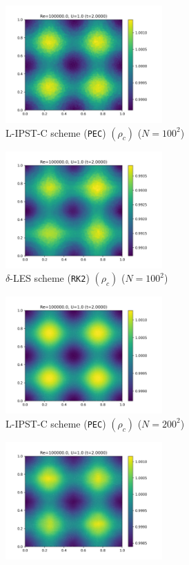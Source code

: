 \begin{figure}[htbp!]
  \begin{subfigure}{7cm}
    \centering\includegraphics[width=6cm]{Code-Figures/long-tgv/c0_20_tait_hdx_2_pec_dtmul_1_sd_n_o_files_50_nx_100_pst_10_re_100000_tsph_wcsph_tf_2/final_rhoc.png}
    \caption{L-IPST-C scheme (\texttt{PEC}) $(\rho_c)$ ($N=100^2$)}
  \end{subfigure}
  \begin{subfigure}{7cm}
    \centering\includegraphics[width=6cm]{Code-Figures/long-tgv/c0_20_tait_hdx_2_rk2_dtmul_1.5_n_o_files_50_nx_100_pst_10_re_100000_deltales_tf_2/final_rhoc.png}
    \caption{$\delta$-LES scheme (\texttt{RK2}) $(\rho_c)$ ($N=100^2$)}
  \end{subfigure}
  \begin{subfigure}{7cm}
  \centering\includegraphics[width=6cm]{Code-Figures/long-tgv/c0_20_tait_hdx_2_pec_dtmul_1_sd_n_o_files_50_nx_200_pst_10_re_100000_tsph_wcsph_tf_2/final_rhoc.png}
  \caption{L-IPST-C scheme (\texttt{PEC}) $(\rho_c)$ ($N=200^2$)}
  \end{subfigure}
  \begin{subfigure}{7cm}
  \centering\includegraphics[width=6cm]{Code-Figures/long-tgv/c0_20_tait_hdx_2_rk2_dtmul_1.5_n_o_files_50_nx_200_pst_10_re_100000_deltales_tf_2/final_rhoc.png}

\end{subfigure}
\end{figure}
